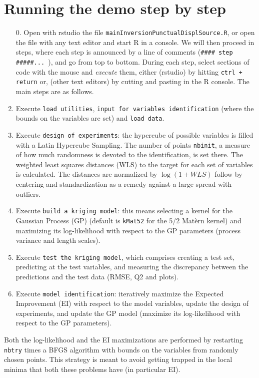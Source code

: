 \documentclass[12pt]{article}
\begin{document}
\section{Running the demo step by step}
\begin{enumerate}
\item[0.] Open with rstudio the file \texttt{mainInversionPunctualDisplSource.R}, or open the file with any text editor and start R in a console. 
We will then proceed in steps, where each step is announced by a line of comments (\verb=#### step #####... =), and go from top to bottom. 
During each step, select sections of code with the mouse and \emph{execute} them, either (rstudio) by hitting \texttt{ctrl + return} 
or, (other text editors) by cutting and pasting in the R console. The main steps are as follows.
\item Execute \texttt{load utilities}, \texttt{input for variables identification} (where the bounds on the variables are set) and \texttt{load data}.  
\item Execute \texttt{design of experiments}: the hypercube of possible variables is filled with a Latin Hypercube Sampling. The number of points 
\texttt{nbinit}, a measure of how much randomness is devoted to the identification, is set there. 
The weighted least squares distances (WLS) to the target for each set of variables is calculated. The distances are normalized by 
$\log(1+WLS)$ follow by centering and standardization as a remedy against a large spread with outliers.
\item Execute \texttt{build a kriging model}: this means selecting a kernel for the Gaussian Process (GP) (default is \texttt{kMat52} for 
the 5/2 Mat\`ern kernel) and maximizing its log-likelihood with respect to the GP parameters (process variance and length scales).
\item Execute \texttt{test the kriging model}, which comprises creating a test set, predicting at the test variables, and measuring 
the discrepancy between the predictions and the test data (RMSE, Q2 and plots).
\item Execute \texttt{model identification}: iteratively maximize the Expected Improvement (EI) with respect to the model variables, 
update the design of experiments, and update the GP model (maximize its log-likelihood with respect to the GP parameters).
\end{enumerate}
Both the log-likelihood and the EI maximizations are performed by restarting \texttt{nbtry} times 
a BFGS algorithm with bounds on the variables from randomly chosen points. This strategy is meant to avoid getting trapped in the local 
minima that both these problems have (in particular EI).
\end{document}
